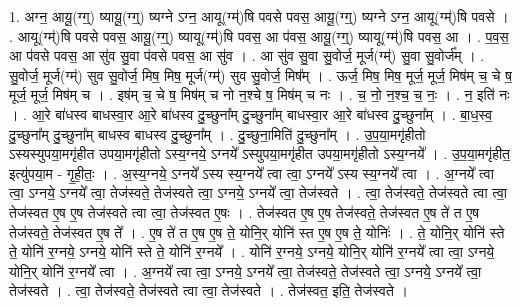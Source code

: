 \documentclass[17pt]{extarticle}
\begin{document}
1. अग्न॒ आयू॒(ग्ग्॒) ष्यायू॒(ग्ग्॒) ष्यग्ने ऽग्न॒ आयू(ग्म्॑)षि पवसे पवस॒ आयू॒(ग्ग्॒) ष्यग्ने ऽग्न॒ आयू(ग्म्॑)षि पवसे । . आयू(ग्म्॑)षि पवसे पवस॒ आयू॒(ग्ग्॒) ष्यायू(ग्म्॑)षि पवस॒ आ प॑वस॒ आयू॒(ग्ग्॒) ष्यायू(ग्म्॑)षि पवस॒ आ । . प॒व॒स॒ आ प॑वसे पवस॒ आ सु॑व सु॒वा प॑वसे पवस॒ आ सु॑व । . आ सु॑व सु॒वा सु॒वोर्ज॒ मूर्ज(ग्म्॑) सु॒वा सु॒वोर्ज᳚म् । . सु॒वोर्ज॒ मूर्ज(ग्म्॑) सुव सु॒वोर्ज॒ मिष॒ मिष॒ मूर्ज(ग्म्॑) सुव सु॒वोर्ज॒ मिष᳚म् । . ऊर्ज॒ मिष॒ मिष॒ मूर्ज॒ मूर्ज॒ मिष॑म् च॒ चे ष॒ मूर्ज॒ मूर्ज॒ मिष॑म् च । . इष॑म् च॒ चे ष॒ मिष॑म् च नो न॒श्चे ष॒ मिष॑म् च नः । . च॒ नो॒ न॒श्च॒ च॒ नः॒ । . न॒ इति॑ नः । . आ॒रे बा॑धस्व बाधस्वा॒र आ॒रे बा॑धस्व दु॒च्छुना᳚म् दु॒च्छुना᳚म् बाधस्वा॒र आ॒रे बा॑धस्व दु॒च्छुना᳚म् । . बा॒ध॒स्व॒ दु॒च्छुना᳚म् दु॒च्छुना᳚म् बाधस्व बाधस्व दु॒च्छुना᳚म् । . दु॒च्छुना॒मिति॑ दु॒च्छुना᳚म् । . उ॒प॒या॒मगृ॑हीतो ऽस्यस्युपया॒मगृ॑हीत उपया॒मगृ॑हीतो ऽस्य॒ग्नये॒ ऽग्नये᳚ ऽस्युपया॒मगृ॑हीत उपया॒मगृ॑हीतो ऽस्य॒ग्नये᳚ । . उ॒प॒या॒मगृ॑हीत॒ इत्यु॑पया॒म - गृ॒ही॒तः॒ । . अ॒स्य॒ग्नये॒ ऽग्नये᳚ ऽस्य स्य॒ग्नये᳚ त्वा त्वा॒ ऽग्नये᳚ ऽस्य स्य॒ग्नये᳚ त्वा । . अ॒ग्नये᳚ त्वा त्वा॒ ऽग्नये॒ ऽग्नये᳚ त्वा॒ तेज॑स्वते॒ तेज॑स्वते त्वा॒ ऽग्नये॒ ऽग्नये᳚ त्वा॒ तेज॑स्वते । . त्वा॒ तेज॑स्वते॒ तेज॑स्वते त्वा त्वा॒ तेज॑स्वत ए॒ष ए॒ष तेज॑स्वते त्वा त्वा॒ तेज॑स्वत ए॒षः । . तेज॑स्वत ए॒ष ए॒ष तेज॑स्वते॒ तेज॑स्वत ए॒ष ते॑ त ए॒ष तेज॑स्वते॒ तेज॑स्वत ए॒ष ते᳚ । . ए॒ष ते॑ त ए॒ष ए॒ष ते॒ योनि॒र् योनि॑ स्त ए॒ष ए॒ष ते॒ योनिः॑ । . ते॒ योनि॒र् योनि॑ स्ते ते॒ योनि॑ र॒ग्नये॒ ऽग्नये॒ योनि॑ स्ते ते॒ योनि॑ र॒ग्नये᳚ । . योनि॑ र॒ग्नये॒ ऽग्नये॒ योनि॒र् योनि॑ र॒ग्नये᳚ त्वा त्वा॒ ऽग्नये॒ योनि॒र् योनि॑ र॒ग्नये᳚ त्वा । . अ॒ग्नये᳚ त्वा त्वा॒ ऽग्नये॒ ऽग्नये᳚ त्वा॒ तेज॑स्वते॒ तेज॑स्वते त्वा॒ ऽग्नये॒ ऽग्नये᳚ त्वा॒ तेज॑स्वते । . त्वा॒ तेज॑स्वते॒ तेज॑स्वते त्वा त्वा॒ तेज॑स्वते । . तेज॑स्वत॒ इति॒ तेज॑स्वते । \newline
\pagebreak
{}
\end{document}
